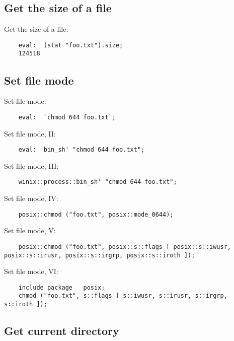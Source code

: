\subsection{Get the size of a file}

Get the size of a file:
\begin{verbatim}
    eval:  (stat "foo.txt").size;
    124518
\end{verbatim}

\cutend*

\subsection{Set file mode}

Set file mode:
\begin{verbatim}
    eval:  `chmod 644 foo.txt`;
\end{verbatim}

Set file mode, II:
\begin{verbatim}
    eval:  bin_sh' "chmod 644 foo.txt";
\end{verbatim}

Set file mode, III:
\begin{verbatim}
    winix::process::bin_sh' "chmod 644 foo.txt";
\end{verbatim}

Set file mode, IV:
\begin{verbatim}
    posix::chmod ("foo.txt", posix::mode_0644);
\end{verbatim}

Set file mode, V:
\begin{verbatim}
    posix::chmod ("foo.txt", posix::s::flags [ posix::s::iwusr, posix::s::irusr, posix::s::irgrp, posix::s::iroth ]);
\end{verbatim}

Set file mode, VI:
\begin{verbatim}
    include package   posix;
    chmod ("foo.txt", s::flags [ s::iwusr, s::irusr, s::irgrp, s::iroth ]);
\end{verbatim}

\cutend*

\subsection{Get current directory}

